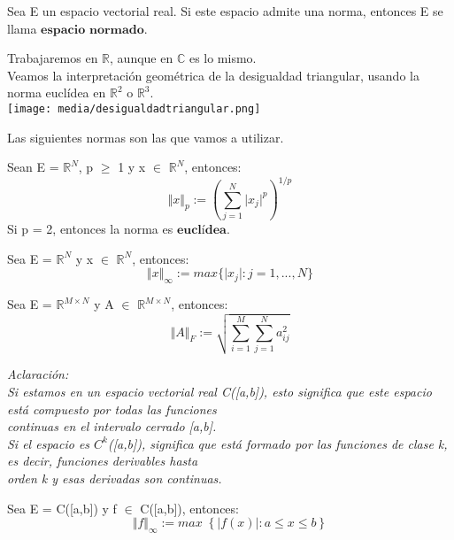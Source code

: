 \begin{ndef}
Sea E un espacio vectorial real. Si este espacio admite una norma, entonces E se llama $\textbf{espacio normado}$.
\end{ndef}

Trabajaremos en $\mathbb{R}$, aunque en $\mathbb{C}$ es lo mismo.\\
Veamos la interpretación geométrica de la desigualdad triangular, usando la norma euclídea en $\mathbb{R}^2$ o $\mathbb{R}^3$.\\ 
\texttt{[image: media/desigualdadtriangular.png]}

Las siguientes normas son las que vamos a utilizar.

\begin{ndef}[Norma p]
Sean E = $\mathbb{R}^N$, p $\geq$ 1 y x $\in$ $\mathbb{R}^N$, entonces:
\[ \Vert x \Vert _{p} := \left( \sum_{j=1}^{N} \vert x_{j} \vert ^p \right) ^{1/p} \]
Si p = 2, entonces la norma es $\textbf{euclídea}$.
\end{ndef}

\begin{ndef}
Sea E = $\mathbb{R}^N$ y x $\in$ $\mathbb{R}^N$, entonces:
\[ \Vert x \Vert _{\infty} := max \lbrace \vert x_{j} \vert : j = 1,...,N \rbrace \]
\end{ndef}

\begin{ndef}
Sea E = $\mathbb{R}^{M \times N}$ y A $\in$ $\mathbb{R}^{M \times N}$, entonces:
\[ \Vert A \Vert _F := \sqrt{\sum_{i=1}^{M} \sum_{j=1}^{N} a_{ij}^2} \]
\end{ndef}

\textit{Aclaración:}\\
\textit{Si estamos en un espacio vectorial real C([a,b]), esto significa que este espacio está compuesto por todas las funciones}\\
\textit{continuas en el intervalo cerrado [a,b].}\\
\textit{Si el espacio es $C^k$([a,b]), significa que está formado por las funciones de clase k, es decir, funciones derivables hasta}\\
\textit{orden k y esas derivadas son continuas.}

\begin{ndef}
Sea E = C([a,b]) y f $\in$ C([a,b]), entonces:
\[ \Vert f \Vert _\infty := max \; \left\lbrace \vert f(x) \vert : a \leq x \leq b \right\rbrace \]
\end{ndef}

